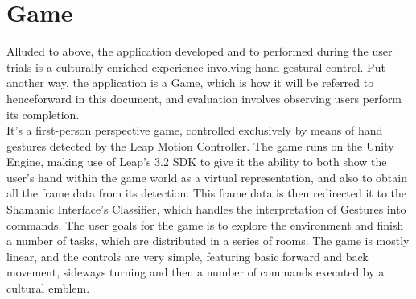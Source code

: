 \section{Game} \label{sec:develop_game}

    Alluded to above, the application developed and to performed during the user trials is a culturally enriched experience involving hand gestural control. Put another way, the application is a Game, which is how it will be referred to henceforward in this document, and evaluation involves observing users perform its completion.\\
    It’s a first-person perspective game, controlled exclusively by means of hand gestures detected by the Leap Motion Controller. The game runs on the Unity Engine, making use of Leap’s 3.2 SDK to give it the ability to both show the user’s hand within the game world as a virtual representation, and also to obtain all the frame data from its detection. This frame data is then redirected it to the Shamanic Interface’s Classifier, which handles the interpretation of Gestures into commands. The user goals for the game is to explore the environment and finish a number of tasks, which are distributed in a series of rooms. The game is mostly linear, and the controls are very simple, featuring basic forward and back movement, sideways turning and then a number of commands executed by a cultural emblem.\\

    
